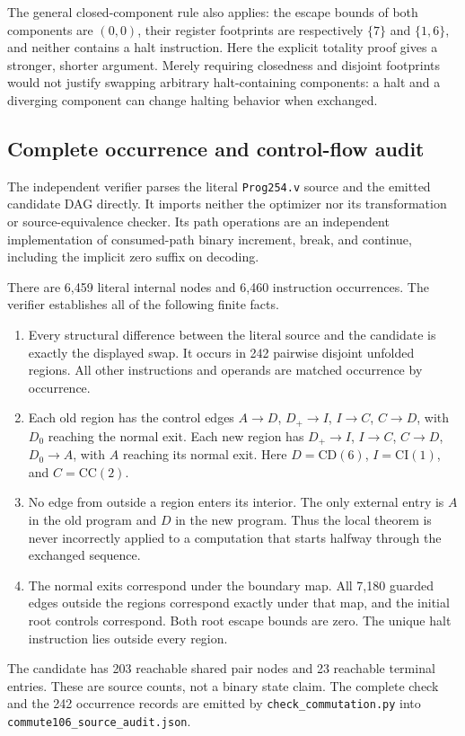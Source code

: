 The general closed-component rule also applies: the escape bounds of
both components are $(0,0)$, their register footprints are respectively
$\{7\}$ and $\{1,6\}$, and neither contains a halt instruction.  Here
the explicit totality proof gives a stronger, shorter argument.  Merely
requiring closedness and disjoint footprints would not justify swapping
arbitrary halt-containing components: a halt and a diverging component
can change halting behavior when exchanged.

\subsection{Complete occurrence and control-flow audit}

The independent verifier parses the literal \texttt{Prog254.v} source
and the emitted candidate DAG directly.  It imports neither the optimizer
nor its transformation or source-equivalence checker.  Its path operations
are an independent implementation of consumed-path binary increment,
break, and continue, including the implicit zero suffix on decoding.

There are 6,459 literal internal nodes and 6,460 instruction occurrences.
The verifier establishes all of the following finite facts.
\begin{enumerate}
\item Every structural difference between the literal source and the
candidate is exactly the displayed swap.  It occurs in 242 pairwise
disjoint unfolded regions.  All other instructions and operands are
matched occurrence by occurrence.
\item Each old region has the control edges
$A\to D$, $D_+\to I$, $I\to C$, $C\to D$, with $D_0$ reaching the
normal exit.  Each new region has
$D_+\to I$, $I\to C$, $C\to D$, $D_0\to A$, with $A$ reaching its
normal exit.  Here $D=\mathrm{CD}(6)$, $I=\mathrm{CI}(1)$, and
$C=\mathrm{CC}(2)$.
\item No edge from outside a region enters its interior.  The only
external entry is $A$ in the old program and $D$ in the new program.
Thus the local theorem is never incorrectly applied to a computation
that starts halfway through the exchanged sequence.
\item The normal exits correspond under the boundary map.  All 7,180
guarded edges outside the regions correspond exactly under that map,
and the initial root controls correspond.  Both root escape bounds are
zero.  The unique halt instruction lies outside every region.
\end{enumerate}
The candidate has 203 reachable shared pair nodes and 23 reachable
terminal entries.  These are source counts, not a binary state claim.
The complete check and the 242 occurrence records are emitted by
\texttt{check\_commutation.py} into
\texttt{commute106\_source\_audit.json}.

